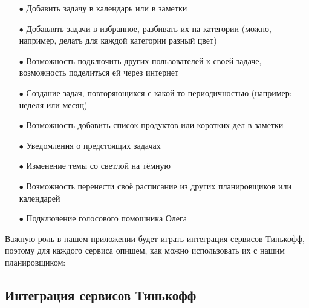 \documentclass[a4paper,12pt]{article} %
\begin{document}
\begin{enumerate}

\item[$\bullet$] Добавить задачу в календарь или в заметки

\item[$\bullet$] Добавлять задачи в избранное, разбивать их на категории (можно, например, делать для каждой категории разный цвет)

\item[$\bullet$] Возможность подключить других пользователей к своей задаче, возможность поделиться ей через интернет

\item[$\bullet$] Создание задач, повторяющихся с какой-то периодичностью (например: неделя или месяц)

\item[$\bullet$] Возможность добавить список продуктов или коротких дел в заметки

\item[$\bullet$] Уведомления о предстоящих задачах

\item[$\bullet$] Изменение темы со светлой на тёмную

\item[$\bullet$] Возможность перенести своё расписание из других планировщиков или календарей

\item[$\bullet$] Подключение голосового помошника Олега

\end{enumerate}

Важную роль в нашем приложении будет играть интеграция сервисов Тинькофф, поэтому для каждого сервиса опишем, как можно использовать их с нашим планировщиком:

\subsection*{Интеграция сервисов Тинькофф} 
\end{document}
